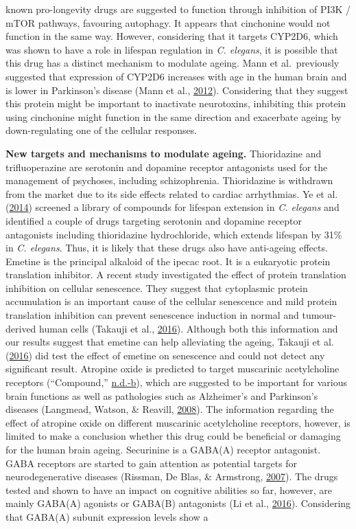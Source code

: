 \documentclass[12pt,twoside]{unicam}
\begin{document}
known pro-longevity drugs are suggested to function through inhibition of PI3K / mTOR pathways, favouring autophagy. It appears that cinchonine would not function in the same way. However, considering that it targets CYP2D6, which was shown to have a role in lifespan regulation in \emph{C. elegans}, it is possible that this drug has a distinct mechanism to modulate ageing. Mann et al.~previously suggested that expression of CYP2D6 increases with age in the human brain and is lower in Parkinson's disease (Mann et al., \protect\hyperlink{ref-Mann2012}{2012}). Considering that they suggest this protein might be important to inactivate neurotoxins, inhibiting this protein using cinchonine might function in the same direction and exacerbate ageing by down-regulating one of the cellular responses.

\textbf{New targets and mechanisms to modulate ageing.} Thioridazine and trifluoperazine are serotonin and dopamine receptor antagonists used for the management of psychoses, including schizophrenia. Thioridazine is withdrawn from the market due to its side effects related to cardiac arrhythmias. Ye et al. (\protect\hyperlink{ref-Ye2014}{2014}) screened a library of compounds for lifespan extension in \emph{C. elegans} and identified a couple of drugs targeting serotonin and dopamine receptor antagonists including thioridazine hydrochloride, which extends lifespan by 31\% in \emph{C. elegans}. Thus, it is likely that these drugs also have anti-ageing effects. Emetine is the principal alkaloid of the ipecac root. It is a eukaryotic protein translation inhibitor. A recent study investigated the effect of protein translation inhibition on cellular senescence. They suggest that cytoplasmic protein accumulation is an important cause of the cellular senescence and mild protein translation inhibition can prevent senescence induction in normal and tumour-derived human cells (Takauji et al., \protect\hyperlink{ref-Takauji2016}{2016}). Although both this information and our results suggest that emetine can help alleviating the ageing, Takauji et al. (\protect\hyperlink{ref-Takauji2016}{2016}) did test the effect of emetine on senescence and could not detect any significant result. Atropine oxide is predicted to target muscarinic acetylcholine receptors (``Compound,'' \protect\hyperlink{ref-CHEMBL2146145}{n.d.}\protect\hyperlink{ref-CHEMBL2146145}{-b}), which are suggested to be important for various brain functions as well as pathologies such as Alzheimer's and Parkinson's diseases (Langmead, Watson, \& Reavill, \protect\hyperlink{ref-Langmead2008}{2008}). The information regarding the effect of atropine oxide on different muscarinic acetylcholine receptors, however, is limited to make a conclusion whether this drug could be beneficial or damaging for the human brain ageing. Securinine is a GABA(A) receptor antagonist. GABA receptors are started to gain attention as potential targets for neurodegenerative diseases (Rissman, De Blas, \& Armstrong, \protect\hyperlink{ref-Rissman2007}{2007}). The drugs tested and shown to have an impact on cognitive abilities so far, however, are mainly GABA(A) agonists or GABA(B) antagonists (Li et al., \protect\hyperlink{ref-Li2016}{2016}). Considering that GABA(A) subunit expression levels show a 
\end{document}
